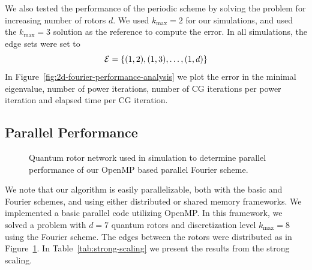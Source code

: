 \documentclass{amsart}
\begin{document}
We also tested the performance of the periodic scheme by solving the problem
for increasing number of rotors $d$. We used $k_\text{max} = 2$ for our
simulations, and used the $k_\text{max} = 3$ solution as the reference to
compute the error. In all simulations, the edge sets were set to
\begin{equation}
  \mathcal{E} = \{(1, 2), (1, 3), \ldots, (1, d)\}
\end{equation}
In Figure~\ref{fig:2d-fourier-performance-analysis} we plot the error in the
minimal eigenvalue, number of power iterations, number of CG iterations per
power iteration and elapsed time per CG iteration.

\subsection{Parallel Performance}

\begin{figure}
  \centering
  \caption{Quantum rotor network used in simulation to determine parallel
  performance of our OpenMP based parallel Fourier scheme.}
  \label{fig:quantum-rotor-network}
\end{figure}

We note that our algorithm is easily parallelizable, both with the basic and
Fourier schemes, and using either distributed or shared memory frameworks. We
implemented a basic parallel code utilizing OpenMP. In this framework, we
solved a problem with $d = 7$ quantum rotors and discretization level
$k_\text{max} = 8$ using the Fourier scheme. The edges between the rotors were
distributed as in Figure~\ref{fig:quantum-rotor-network}. In
Table~\ref{tab:strong-scaling} we present the results from the strong scaling.
\end{document}

